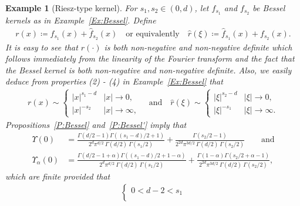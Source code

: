 \documentclass[sn-mathphys]{sn-jnl}%
\numberwithin{equation}{section}
\theoremstyle{thmstyleone}%
\theoremstyle{thmstyletwo}%
\newtheorem{example}{Example}[section]%
\theoremstyle{thmstylethree}%
\begin{document}
\begin{example}[Riesz-type kernel]\label{Ex:Riesz-T}
  For $s_1, s_2\in (0,d)$, let $f_{s_1}$ and $f_{s_2}$ be Bessel kernels as in
  Example~\ref{Ex:Bessel}. Define
  \begin{align*}
    r(x)\coloneqq f_{s_1}(x) + \widehat{f}_{s_2}(x) \quad \text{or equivalently} \quad
    \widehat{r}(\xi)\coloneqq \widehat{f}_{s_1}(x) + f_{s_2}(x).
  \end{align*}
  It is easy to see that $r(\cdot)$ is both non-negative and non-negative definite which follows
  immediately from the linearity of the Fourier transform and the fact that the Bessel kernel is
  both non-negative and non-negative definite. Also, we easily deduce from properties (2) - (4) in
  Example~\ref{Ex:Bessel} that
  \begin{align*}
    r(x) \sim
    \begin{cases}
      \lvert x \rvert^{s_1-d} & \lvert x \rvert \to 0, \\
      \lvert x \rvert^{-s_2}  & \lvert x \rvert \to \infty,
    \end{cases}
    \quad \text{and} \quad
    \widehat{r}(\xi) \sim
    \begin{cases}
      \lvert\xi\rvert^{s_2 - d} & \lvert\xi\rvert \to 0, \\
      \lvert\xi\rvert^{-s_1}    & \lvert\xi\rvert \to \infty.
    \end{cases}
  \end{align*}
  Propositions~\ref{P:Bessel} and~\ref{P:Bessel'} imply that
  \begin{align}\label{E:RieszType-0}
    \Upsilon(0) & =
    \frac{\Gamma\left(d/2 -1\right) \Gamma\left((s_1 - d)/2 + 1\right)}{2^d \pi^{d/2} \: \Gamma(d/2)\:\Gamma\left(s_1/2\right)}
    + \frac{\Gamma\left(s_2/2 - 1\right)}{2^{2d} \pi^{3d/2} \: \Gamma(d/2) \: \Gamma\left(s_2/2\right)} \qquad \text{and} \\
    \Upsilon_{\alpha}(0) & =
    \frac{\Gamma\left(d/2 -1 + \alpha\right) \Gamma\left((s_1 - d)/2 + 1 - \alpha\right)}{2^d \pi^{d/2} \: \Gamma(d/2)\:\Gamma\left(s_1/2\right)}
    + \frac{\Gamma\left(1 - \alpha\right) \Gamma\left( s_2/2 + \alpha - 1\right)}{2^{2d} \pi^{3d/2} \: \Gamma(d/2) \: \Gamma\left(s_2/2\right)},
    \label{E:RieszType}
  \end{align}
  which are finite provided that
	\begin{align}\label{E:RieszTypeCond}
    \begin{cases}
      0 < d - 2 < s_1 \\

\end{cases}
\end{align}
\end{example}
\end{document}
